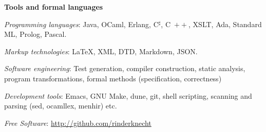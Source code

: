 \documentclass[a4paper,11pt]{article}
\newcommand{\cpp}{\mbox{C \hspace*{-2.5mm} \raise 0.7mm \hbox{${\scriptscriptstyle ++}$}}}
\begin{document}
\bigskip
\noindent\textbf{\large Tools and formal languages}
\medskip
\begin{itemize*}

  \item \textit{Programming languages}: Java, OCaml, Erlang,
    C$^\sharp$, \cpp, XSLT, Ada, Standard ML, Prolog, Pascal.

  \item \textit{Markup technologies}: \LaTeX, XML, DTD, Markdown,
    JSON.


  \item \textit{Software engineering}: Test generation, compiler
    construction, static analysis, program transformations, formal
    methods (specification, correctness) %



  \item \textit{Development tools}: Emacs, GNU Make, dune, git, shell
    scripting, scanning and parsing (sed, ocamllex, menhir) etc.

  \item \textit{Free Software}: \url{http://github.com/rinderknecht}


\end{itemize*}
\end{document}
